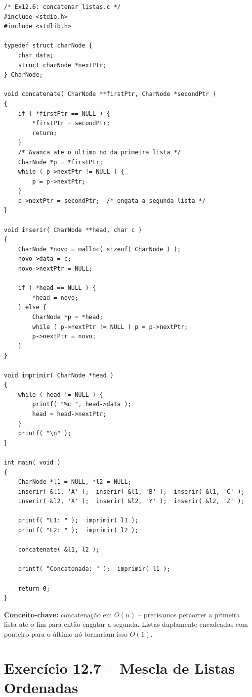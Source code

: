 \documentclass[12pt,a4paper]{article}
\begin{document}
\begin{respostabox}
\begin{lstlisting}
/* Ex12.6: concatenar_listas.c */
#include <stdio.h>
#include <stdlib.h>

typedef struct charNode {
    char data;
    struct charNode *nextPtr;
} CharNode;

void concatenate( CharNode **firstPtr, CharNode *secondPtr )
{
    if ( *firstPtr == NULL ) {
        *firstPtr = secondPtr;
        return;
    }
    /* Avanca ate o ultimo no da primeira lista */
    CharNode *p = *firstPtr;
    while ( p->nextPtr != NULL ) {
        p = p->nextPtr;
    }
    p->nextPtr = secondPtr;  /* engata a segunda lista */
}

void inserir( CharNode **head, char c )
{
    CharNode *novo = malloc( sizeof( CharNode ) );
    novo->data = c;
    novo->nextPtr = NULL;

    if ( *head == NULL ) {
        *head = novo;
    } else {
        CharNode *p = *head;
        while ( p->nextPtr != NULL ) p = p->nextPtr;
        p->nextPtr = novo;
    }
}

void imprimir( CharNode *head )
{
    while ( head != NULL ) {
        printf( "%c ", head->data );
        head = head->nextPtr;
    }
    printf( "\n" );
}

int main( void )
{
    CharNode *l1 = NULL, *l2 = NULL;
    inserir( &l1, 'A' );  inserir( &l1, 'B' );  inserir( &l1, 'C' );
    inserir( &l2, 'X' );  inserir( &l2, 'Y' );  inserir( &l2, 'Z' );

    printf( "L1: " );  imprimir( l1 );
    printf( "L2: " );  imprimir( l2 );

    concatenate( &l1, l2 );

    printf( "Concatenada: " );  imprimir( l1 );

    return 0;
}
\end{lstlisting}

\textbf{Conceito-chave:} concatenação em $O(n)$ -- precisamos percorrer a primeira
lista até o fim para então engatar a segunda. Listas duplamente encadeadas com
ponteiro para o último nó tornariam isso $O(1)$.
\end{respostabox}

\newpage

\section{Exercício 12.7 -- Mescla de Listas Ordenadas}
\end{document}
